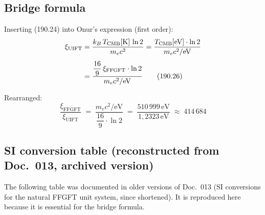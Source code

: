 \subsection*{Bridge formula}

Inserting (190.24) into Onur's expression (first order):
\begin{align}
  \xi_\text{UIFT}
  &= \frac{k_B\,T_\text{CMB}[\text{K}]\,\ln 2}{m_e c^2}
  = \frac{T_\text{CMB}[\text{eV}]\cdot\ln 2}{m_e c^2 / \text{eV}}
  \notag\\[4pt]
  &= \frac{\dfrac{16}{9}\,\xi_\text{FFGFT}\cdot\ln 2}{m_e c^2/\text{eV}}
  \tag{190.26}
\end{align}

Rearranged:
\begin{equation}
  \boxed{
  \frac{\xi_\text{FFGFT}}{\xi_\text{UIFT}}
  \;=\;
  \frac{m_e c^2/\text{eV}}{\dfrac{16}{9}\cdot\ln 2}
  \;=\;
  \frac{510\,999\,\text{eV}}{1{,}2323\,\text{eV}}
  \;\approx\; 414\,684
  }
  \tag{190.27}
\end{equation}

\subsection*{SI conversion table (reconstructed from Doc.~013, archived version)}

The following table was documented in older versions of Doc.~013 (SI
conversions for the natural FFGFT unit system, since shortened). It is
reproduced here because it is essential for the bridge formula.

\begin{center}
\renewcommand{\arraystretch}{1.4}
{\small
{}
}
\end{center}

